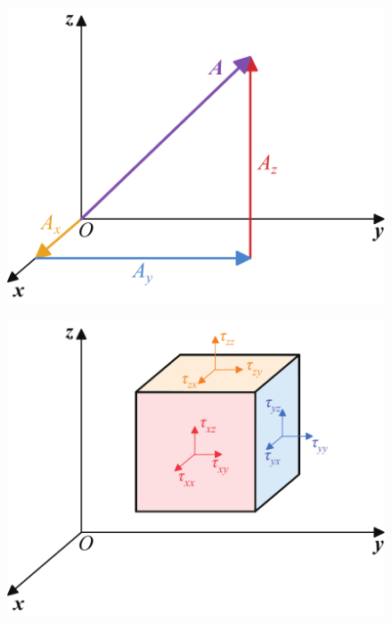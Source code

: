 \begin{figure}[!htb]
	\centering
	\begin{minipage}{0.49\linewidth}
		\centering
		\includegraphics[width=0.92\linewidth]{pic/一阶张量}
		\label{一阶张量}
	\end{minipage}
	\begin{minipage}{0.49\linewidth}
		\centering
		\includegraphics[width=0.92\linewidth]{pic/二阶张量}
		\label{二阶张量}
	\end{minipage}
\end{figure}
\newpage

\sssection[2阶张量]

